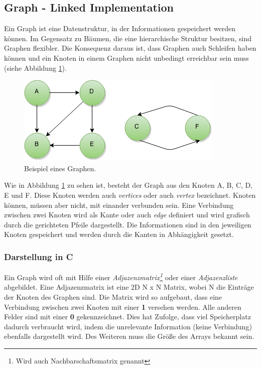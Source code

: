 \subsection{Graph - Linked Implementation} 
Ein Graph ist eine Datenstruktur, in der Informationen gespeichert werden können. Im Gegensatz zu Bäumen, die eine hierarchische Struktur besitzen, sind Graphen flexibler. Die Konsequenz daraus ist, dass Graphen auch Schleifen haben können und ein Knoten in einem Graphen nicht unbedingt erreichbar sein muss (siehe Abbildung \ref{fig:Graph}).
\begin{figure}[h]
	\centering
	\includegraphics[scale=0.5]{images/Graph.png} 
	\caption{Beispiel eines Graphen.}
	\label{fig:Graph}
\end{figure}
Wie in Abbildung \ref{fig:Graph} zu sehen ist, besteht der Graph aus den Knoten A, B, C, D, E und F. Diese Knoten werden auch \textit{vertices} oder auch \textit{vertex} bezeichnet. Knoten können, müssen aber nicht, mit einander verbunden sein. Eine Verbindung zwischen zwei Knoten wird als Kante oder auch \textit{edge} definiert und wird grafisch durch die gerichteten Pfeile dargestellt. Die Informationen sind in den jeweiligen Knoten gespeichert und werden durch die Kanten in Abhängigkeit gesetzt. 

\subsubsection*{Darstellung in C}
Ein Graph wird oft mit Hilfe einer \textit{Adjazenzmatrix\footnote{Wird auch Nachbarschaftsmatrix genannt}} oder einer \textit{Adjazenzliste} abgebildet. Eine Adjazenzmatrix ist eine 2D N x N Matrix, wobei N die Einträge der Knoten des Graphen sind. Die Matrix wird so aufgebaut, dass eine Verbindung zwischen zwei Knoten mit einer \textbf{1} versehen werden. Alle anderen Felder sind mit einer \textbf{0} gekennzeichnet. Dies hat Zufolge, dass viel Speicherplatz dadurch verbraucht wird, indem die unrelevante Information (keine Verbindung) ebenfalls dargestellt wird. Des Weiteren muss die Größe des Arrays bekannt sein. 

